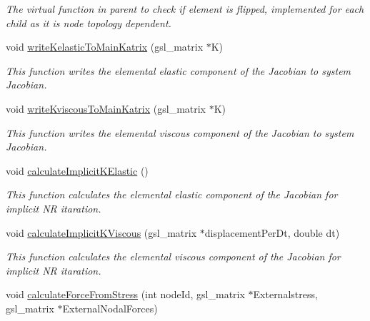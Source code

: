 \begin{DoxyCompactItemize}
\begin{DoxyCompactList}\small\item\em The virtual function in parent to check if element is flipped, implemented for each child as it is node topology dependent. \end{DoxyCompactList}\item 
\hypertarget{classShapeBase_a2bfdde187477364a5a0e2220ea6b2e0e}{}void \hyperlink{classShapeBase_a2bfdde187477364a5a0e2220ea6b2e0e}{write\+Kelastic\+To\+Main\+Katrix} (gsl\+\_\+matrix $\ast$K)\label{classShapeBase_a2bfdde187477364a5a0e2220ea6b2e0e}

\begin{DoxyCompactList}\small\item\em This function writes the elemental elastic component of the Jacobian to system Jacobian. \end{DoxyCompactList}\item 
\hypertarget{classShapeBase_a388d38c2d6588c7ddf622f1deed53853}{}void \hyperlink{classShapeBase_a388d38c2d6588c7ddf622f1deed53853}{write\+Kviscous\+To\+Main\+Katrix} (gsl\+\_\+matrix $\ast$K)\label{classShapeBase_a388d38c2d6588c7ddf622f1deed53853}

\begin{DoxyCompactList}\small\item\em This function writes the elemental viscous component of the Jacobian to system Jacobian. \end{DoxyCompactList}\item 
\hypertarget{classShapeBase_a922c41864d4826725cc72089046f818c}{}void \hyperlink{classShapeBase_a922c41864d4826725cc72089046f818c}{calculate\+Implicit\+K\+Elastic} ()\label{classShapeBase_a922c41864d4826725cc72089046f818c}

\begin{DoxyCompactList}\small\item\em This function calculates the elemental elastic component of the Jacobian for implicit N\+R itaration. \end{DoxyCompactList}\item 
void \hyperlink{classShapeBase_a20c23d30b7f9f3bc7ed2fde542401aeb}{calculate\+Implicit\+K\+Viscous} (gsl\+\_\+matrix $\ast$displacement\+Per\+Dt, double dt)
\begin{DoxyCompactList}\small\item\em This function calculates the elemental viscous component of the Jacobian for implicit N\+R itaration. \end{DoxyCompactList}\item 
\hypertarget{classShapeBase_a6a9f16ddb320974584323d78ca4aec9c}{}void \hyperlink{classShapeBase_a6a9f16ddb320974584323d78ca4aec9c}{calculate\+Force\+From\+Stress} (int node\+Id, gsl\+\_\+matrix $\ast$Externalstress, gsl\+\_\+matrix $\ast$External\+Nodal\+Forces)\label{classShapeBase_a6a9f16ddb320974584323d78ca4aec9c}


\end{DoxyCompactItemize}
